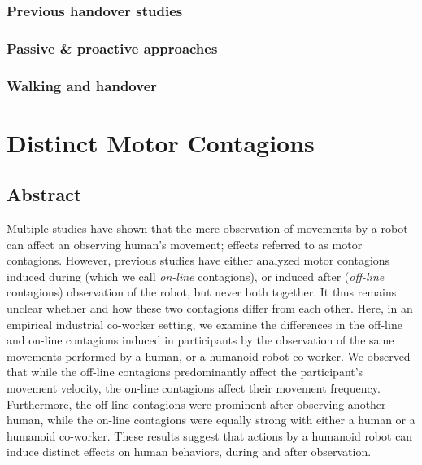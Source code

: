 \documentclass[a4paper, 12pt, oneside]{Thesis}  %
\begin{document}
\subsection{Previous handover studies}


\subsection{Passive \& proactive approaches}


\subsection{Walking and handover}



\clearpage

{\color{blue}\chapter{Distinct Motor Contagions}\label{distinct motor contagion}}


\section*{Abstract}

Multiple studies have shown that the mere observation of movements by a robot can affect an observing human's movement; effects referred to as motor contagions. However, previous studies have either analyzed motor contagions induced during (which we call \emph{on-line} contagions), or induced after (\emph{off-line} contagions) observation of the robot, but never both together. It thus remains unclear whether and how these two contagions differ from each other. Here, in an empirical industrial co-worker setting, we examine the differences in the off-line and on-line contagions induced in participants by the observation of the same movements performed by a human, or a humanoid robot co-worker. We observed that while the off-line contagions predominantly affect the participant's movement velocity, the on-line contagions affect their movement frequency. Furthermore, the off-line contagions were prominent after observing another human, while the on-line contagions were equally strong with either a human or a humanoid co-worker. These results suggest that actions by a humanoid robot can induce distinct effects on human behaviors, during and after observation.  	
\end{document}
